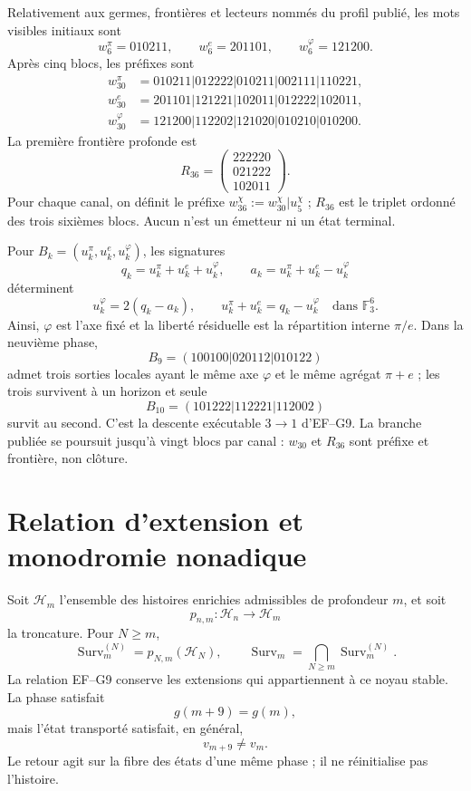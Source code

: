 Relativement aux germes, frontières et lecteurs nommés du profil
publié, les mots visibles initiaux sont
\[
 w_6^\pi=010211,\qquad w_6^e=201101,\qquad
 w_6^\varphi=121200.
\]
Après cinq blocs, les préfixes sont
\[
\begin{aligned}
w_{30}^{\pi}&=010211|012222|010211|002111|110221,\\
w_{30}^{e}&=201101|121221|102011|012222|102011,\\
w_{30}^{\varphi}&=121200|112202|121020|010210|010200.
\end{aligned}
\]
La première frontière profonde est
\[
 R_{36}=
 \begin{pmatrix}222220\\021222\\102011\end{pmatrix}.
\]
Pour chaque canal, on définit le préfixe
\(w_{36}^\chi:=w_{30}^\chi|u_5^\chi\) ; \(R_{36}\) est le triplet ordonné des
trois sixièmes blocs. Aucun n'est un émetteur ni un état terminal.

Pour \(B_k=(u_k^\pi,u_k^e,u_k^\varphi)\), les signatures
\[
 q_k=u_k^\pi+u_k^e+u_k^\varphi,\qquad
 a_k=u_k^\pi+u_k^e-u_k^\varphi
\]
déterminent
\[
 u_k^\varphi=2(q_k-a_k),\qquad
 u_k^\pi+u_k^e=q_k-u_k^\varphi
 \quad\text{dans }\mathbb F_3^6.
\]
Ainsi, \(\varphi\) est l'axe fixé et la liberté résiduelle est la répartition
interne \(\pi/e\). Dans la neuvième phase,
\[
 B_9=(100100|020112|010122)
\]
admet trois sorties locales ayant le même axe \(\varphi\) et le même agrégat
\(\pi+e\) ; les trois survivent à un horizon et seule
\[
 B_{10}=(101222|112221|112002)
\]
survit au second. C'est la descente exécutable \(3\to1\) d'EF--G9.
La branche publiée se poursuit jusqu'à vingt blocs par canal : \(w_{30}\) et
\(R_{36}\) sont préfixe et frontière, non clôture.

\section{Relation d'extension et monodromie nonadique}
\label{sec:extension-monodromia-tpk}

Soit \(\mathcal H_m\) l'ensemble des histoires enrichies admissibles de
profondeur \(m\), et soit
\[
 p_{n,m}:\mathcal H_n\longrightarrow\mathcal H_m
\]
la troncature. Pour \(N\geq m\),
\[
 \operatorname{Surv}_m^{(N)}=p_{N,m}(\mathcal H_N),
 \qquad
 \operatorname{Surv}_m=\bigcap_{N\geq m}\operatorname{Surv}_m^{(N)}.
\]
La relation EF--G9 conserve les extensions qui appartiennent à ce noyau
stable. La phase satisfait
\[
 g(m+9)=g(m),
\]
mais l'état transporté satisfait, en général,
\[
 v_{m+9}\ne v_m.
\]
Le retour agit sur la fibre des états d'une même phase ; il ne réinitialise pas
l'histoire.

